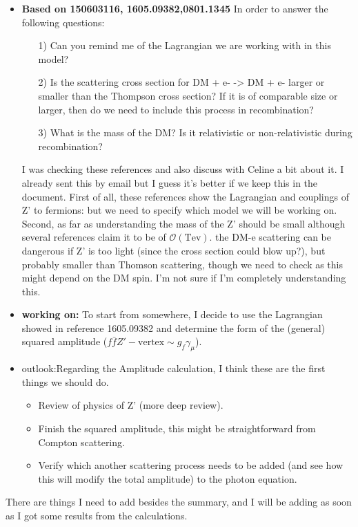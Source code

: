 \documentclass[amssymb,useAMS,prd,aps,amsmath,onecolumn,superscriptaddress,nofootinbib]{revtex4}
\begin{document}
\begin{itemize}
\begin{itemize}
\begin{itemize}
		\end{itemize}
\end{itemize}
\item \textbf{Based on 150603116, 1605.09382,0801.1345} In order to answer the following questions:
	\begin{itemize}
	\item [1)] Can you remind me of the Lagrangian we are working with in this model?
	\item[2)] Is the scattering cross section for DM + e-  ->  DM + e- larger or smaller than the Thompson cross section? If 	it is of comparable size or larger, then do we need to include this process in recombination? 
	\item[3)] What is the mass of the DM? Is it relativistic or non-relativistic during recombination?
	\end{itemize}
I was checking these references and also discuss with Celine a bit about it. I already sent this by email but I guess it's better if we keep this in the document. First of all, these references  show the Lagrangian and couplings of Z' to fermions: but we need to specify which model we will be working on. Second, as far as understanding the  mass of the Z' should be small although several references claim it to be of $\mathcal{O}(\mathrm{Tev})$. the  DM-e scattering can be dangerous if Z' is too light (since the cross section could blow up?), but probably smaller than Thomson scattering, though we need to check as this might depend on the DM spin. I'm not sure if I'm completely understanding this. 
\item \textbf{working on:} To start from somewhere, I decide to use the Lagrangian showed in reference 1605.09382 and determine the form of the (general) squared amplitude ($f\bar{f} Z'-\mathrm{vertex}\sim g_f\gamma_\mu$). 
\item\textrm{outlook:}Regarding the Amplitude calculation, I think these are the first things we should do.
	\begin{itemize}
	\item Review of physics of Z' (more deep review).
    \item Finish the squared amplitude, this might be  straightforward from Compton scattering.
    \item Verify which another scattering process needs to be added (and see how this will modify the total amplitude)  to the           photon equation.
	\end{itemize}
\end{itemize}
There are things I need to add besides the summary, and I will be adding as soon as I got some results from the calculations.
\end{document}

